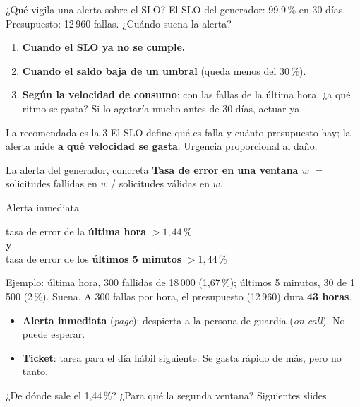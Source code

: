 \documentclass[institutional,screen,none]{ua-engineering-v6-beamer}
\begin{document}
\begin{frame}{¿Qué vigila una alerta sobre el SLO?}
El SLO del generador: 99,9\,\% en 30 días. Presupuesto: 12\,960 fallas. ¿Cuándo suena la alerta?

\begin{enumerate}
\item \textbf{Cuando el SLO ya no se cumple.} 
\pause
\item \textbf{Cuando el saldo baja de un umbral} (queda menos del 30\,\%). 
\pause
\item \textbf{Según la velocidad de consumo}: con las fallas de la última hora, ¿a qué ritmo se gasta? Si lo agotaría mucho antes de 30 días, actuar ya.
\end{enumerate}

\pause

\begin{block}{La recomendada es la 3}
El SLO define qué es falla y cuánto presupuesto hay; la alerta mide \textbf{a qué velocidad se gasta}. Urgencia proporcional al daño.
\end{block}
\end{frame}

\begin{frame}{La alerta del generador, concreta}
\textbf{Tasa de error en una ventana $w$} $=$ solicitudes fallidas en $w$ / solicitudes válidas en $w$.

\begin{block}{Alerta inmediata}
\begin{center}
tasa de error de la \textbf{última hora} $> 1{,}44\,\%$\\
\textbf{y}\\
tasa de error de los \textbf{últimos 5 minutos} $> 1{,}44\,\%$
\end{center}
\end{block}

\pause

{\small Ejemplo: última hora, 300 fallidas de 18\,000 (1,67\,\%); últimos 5 minutos, 30 de 1\,500 (2\,\%). Suena. A 300 fallas por hora, el presupuesto (12\,960) dura \textbf{43 horas}.}

\pause

\begin{itemize}\small
\item \textbf{Alerta inmediata} (\emph{page}): despierta a la persona de guardia (\emph{on-call}). No puede esperar.
\item \textbf{Ticket}: tarea para el día hábil siguiente. Se gasta rápido de más, pero no tanto.
\end{itemize}

{\small ¿De dónde sale el 1,44\,\%? ¿Para qué la segunda ventana? Siguientes slides.}
\end{frame}
\end{document}
